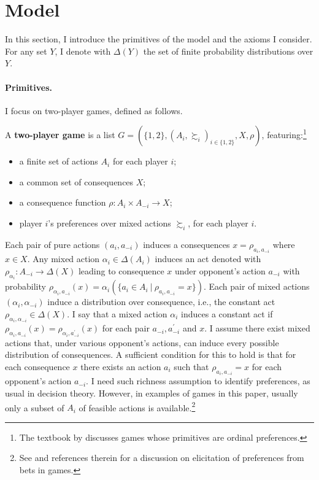 \section{Model}\label{sec:modeluniv}

In this section, I introduce the primitives of the model and the axioms I consider. For any set \( Y \), I denote with \( \Delta ( Y ) \) the set of finite probability distributions over \( Y \).

\paragraph{Primitives.} I focus on two-player games, defined as follows.

\begin{definition}\label{def:game}
	A \textbf{two-player game} is a list \( G = ( \{1,2 \}, ( A_i, \succsim_i )_{i \in \{1,2 \}}, X,  \rho ) \), featuring:\footnote{The textbook by \cite{bonanno2018gametheory} discusses games whose primitives are ordinal preferences.}
	\begin{itemize}
		\item a finite set of actions \(A_i\) for each player \( i \);
		\item a common set of consequences \( X \);
		\item a consequence function \(\rho \colon A_i \times  A_{-i} \rightarrow X \);
		\item player \(i\)'s preferences over mixed actions \(\succsim_i \), for each player \( i \).
	\end{itemize}
\end{definition}

Each pair of pure actions \( (a_i, a_{-i} ) \) induces a consequences \( x = \rho_{a_i, a_{-i}} \) where \( x \in X \). Any mixed action \( \alpha_i \in \Delta ( A_i ) \) induces an \citeauthor{anscombeDefinitionSubjectiveProbability1963} act denoted with \( \rho_{\alpha_i} \colon A_{-i} \rightarrow \Delta ( X ) \) leading to consequence \( x \) under opponent's action \( a_{-i} \) with probability \( \rho_{\alpha_i,a_{-i}} ( x ) = \alpha_i ( \{ a_i \in A_i \: | \: \rho_{a_i,a_{-i}} = x \} ) \). Each pair of mixed actions \( (\alpha_i, \alpha_{-i}) \) induce a distribution over consequence, i.e., the constant act \( \rho_{\alpha_i, \alpha_{-i}} \in \Delta (X) \). I say that a mixed action \( \alpha_i \) induces a constant act if \( \rho_{\alpha_i, a_{-i}} (x) = \rho_{\alpha_i, a^{\prime}_{-i}} (x) \) for each pair \(a_{-i}, a^{\prime}_{-i} \) and \( x \). I assume there exist mixed actions that, under various opponent's actions, can induce every possible distribution of consequences. A sufficient condition for this to hold is that for each consequence \( x \) there exists an action \( a_i \) such that \( \rho_{a_i,a_{-i}} = x \) for each opponent's action \( a_{-i} \). I need such richness assumption to identify preferences, as usual in decision theory. However, in examples of games in this paper, usually only a subset of \( A_i \) of feasible actions is available.\footnote{See \citet[p. 631]{dekelEpistemicGameTheory2015} and references therein for a discussion on elicitation of preferences from bets in games.}

